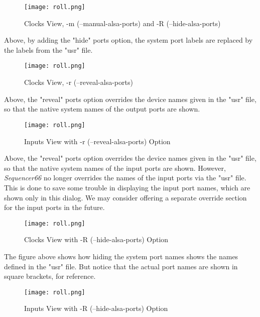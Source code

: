 \begin{figure}[H]
   \centering 
   \texttt{[image: roll.png]}
   \caption{Clocks View, -m (--manual-alsa-ports) and -R (--hide-alsa-ports)}
   \label{fig:seq66_clock_m_R}
\end{figure}

   Above, by adding the "hide" ports option, the system port labels are
   replaced by the labels from the "usr" file.

\begin{figure}[H]
   \centering 
   \texttt{[image: roll.png]}
   \caption{Clocks View, -r (--reveal-alsa-ports)}
   \label{fig:seq66_clock_r}
\end{figure}

   Above, the "reveal" ports option overrides the device names given in the
   "usr" file, so that the native system names of the output ports are shown.

\begin{figure}[H]
   \centering 
   \texttt{[image: roll.png]}
   \caption{Inputs View with -r (--reveal-alsa-ports) Option}
   \label{fig:seq66_input_r}
\end{figure}

   Above, the "reveal" ports option overrides the device names given in the
   "usr" file, so that the native system names of the input ports are shown.
   However, \textsl{Sequencer66} no longer overrides the
   names of the input ports via the "usr" file.  This is done to
   save some trouble in displaying the input port names, which are shown
   only in this dialog.  We may consider offering a separate override section
   for the input ports in the future.

\begin{figure}[H]
   \centering 
   \texttt{[image: roll.png]}
   \caption{Clocks View with -R (--hide-alsa-ports) Option}
   \label{fig:seq66_clock_R}
\end{figure}

   The figure above shows how hiding the system port names shows the names
   defined in the "usr" file.  But notice that the actual port names are shown
   in square brackets, for reference.

\begin{figure}[H]
   \centering 
   \texttt{[image: roll.png]}
   \caption{Inputs View with -R (--hide-alsa-ports) Option}
   \label{fig:seq66_input_R}
\end{figure}


